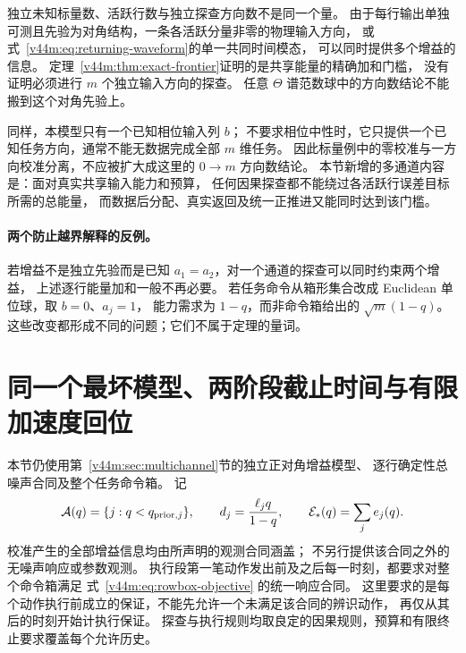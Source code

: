\documentclass[11pt,a4paper]{article}
\numberwithin{equation}{section}
\theoremstyle{definition}
\begin{document}
独立未知标量数、活跃行数与独立探查方向数不是同一个量。
由于每行输出单独可测且先验为对角结构，一条各活跃分量非零的物理输入方向，
或式~\eqref{v44m:eq:returning-waveform}的单一共同时间模态，
可以同时提供多个增益的信息。
定理~\ref{v44m:thm:exact-frontier}证明的是共享能量的精确加和门槛，
没有证明必须进行 $m$ 个独立输入方向的探查。
任意 $\Theta$ 谱范数球中的方向数结论不能搬到这个对角先验上。

同样，本模型只有一个已知相位输入列 $b$；
不要求相位中性时，它只提供一个已知任务方向，通常不能无数据完成全部 $m$ 维任务。
因此标量例中的零校准与一方向校准分离，不应被扩大成这里的 $0\to m$ 方向数结论。
本节新增的多通道内容是：面对真实共享输入能力和预算，
任何因果探查都不能绕过各活跃行误差目标所需的总能量，
而数据后分配、真实返回及统一正推进又能同时达到该门槛。

\paragraph{两个防止越界解释的反例。}
若增益不是独立先验而是已知 $a_1=a_2$，对一个通道的探查可以同时约束两个增益，
上述逐行能量加和一般不再必要。
若任务命令从箱形集合改成 Euclidean 单位球，取 $b=0$、$a_j=1$，
能力需求为 $1-q$，而非命令箱给出的 $\sqrt m(1-q)$。
这些改变都形成不同的问题；它们不属于定理的量词。



\section{同一个最坏模型、两阶段截止时间与有限加速度回位}
\label{v44d:sec:deadline}

本节仍使用第~\ref{v44m:sec:multichannel}节的独立正对角增益模型、
逐行确定性总噪声合同及整个任务命令箱。
记
\[
 \mathcal A(q)=\{j:q<q_{{\rm prior},j}\},\qquad
 d_j=\frac{\ell_jq}{1-q},\qquad
 \mathcal E_*(q)=\sum_j e_j(q).
\]
校准产生的全部增益信息均由所声明的观测合同涵盖；
不另行提供该合同之外的无噪声响应或参数观测。
执行段第一笔动作发出前及之后每一时刻，都要求对整个命令箱满足
式~\eqref{v44m:eq:rowbox-objective} 的统一响应合同。
这里要求的是每个动作执行前成立的保证，不能先允许一个未满足该合同的辨识动作，
再仅从其后的时刻开始计执行保证。
探查与执行规则均取良定的因果规则，预算和有限终止要求覆盖每个允许历史。
\end{document}
